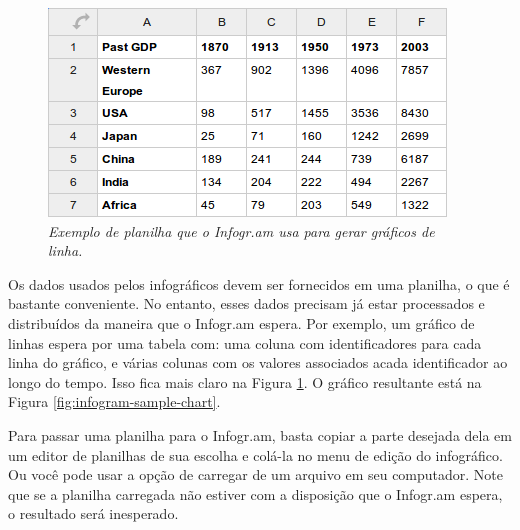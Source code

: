\documentclass[12pt,onecolumn]{article}
\begin{document}
    \begin{figure}[ht]
      \centering
      \includegraphics[width=.9\linewidth]{infogram-sample-spreadsheet.png}
      \caption{
        \footnotesize
        \it
        Exemplo de planilha que o Infogr.am usa para gerar gráficos de linha.
      }
      \label{fig:infogram-sample-spreadsheet}
    \end{figure}
    
    Os dados usados pelos infográficos devem ser fornecidos em uma planilha, o que
    é bastante conveniente. No entanto, esses dados precisam já estar processados
    e distribuídos da maneira que o Infogr.am espera. Por exemplo, um gráfico de
    linhas espera por uma tabela com: uma coluna com identificadores para cada
    linha do gráfico, e várias colunas com os valores associados acada
    identificador ao longo do tempo. Isso fica mais claro na Figura
    \ref{fig:infogram-sample-spreadsheet}. O gráfico resultante está na Figura
    \ref{fig:infogram-sample-chart}.
    
    Para passar uma planilha para o Infogr.am, basta copiar a parte desejada
    dela em um editor de planilhas de sua escolha e colá-la no menu de edição do
    infográfico. Ou você pode usar a opção de carregar de um arquivo em seu
    computador. Note que se a planilha carregada não estiver com a disposição
    que o Infogr.am espera, o resultado será inesperado.
    
\end{document}
